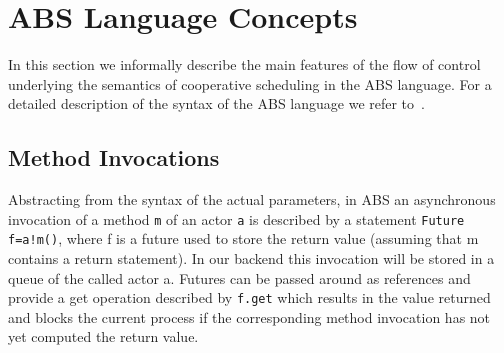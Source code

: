 

\section{ABS Language Concepts}
\label{lang}
In this section we informally describe the main features of the flow of control
underlying the semantics of cooperative scheduling in the ABS language.
For a detailed description of the syntax of the ABS language we refer to~\cite{abs}.


\subsection{Method Invocations}\label{amc}
Abstracting from the syntax of the actual parameters,
in ABS an asynchronous invocation of a method \lstinline|m| of an actor \lstinline|a| is described by a statement
\lstinline|Future f=a!m()|, where f is a future used to store the return value
(assuming that m contains a return statement).
In our backend this invocation will be stored in a queue of the called actor a.
Futures can be passed around as references and provide a get operation
described by \lstinline|f.get| which results in the value returned and blocks
the current process if the corresponding method invocation has not yet computed
the return value.

